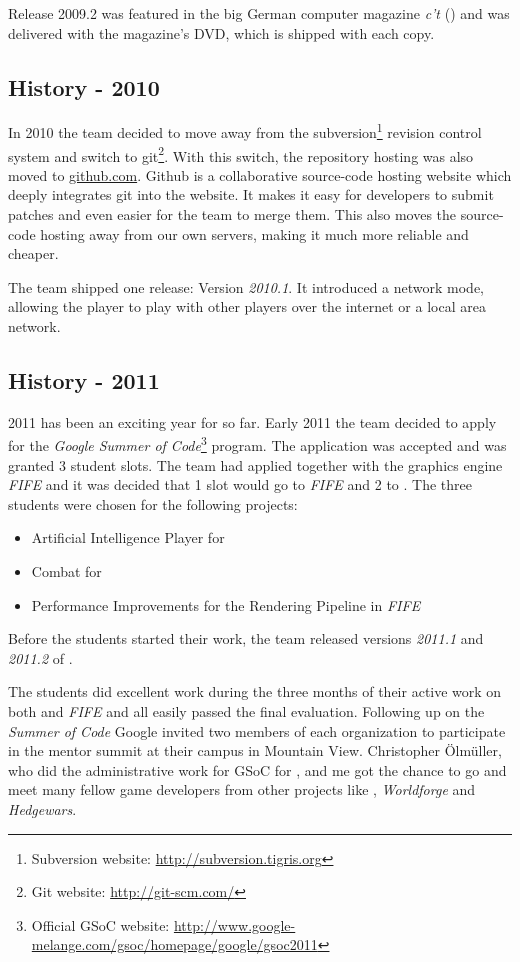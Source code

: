 Release 2009.2 was featured in the big German computer magazine \textit{c't} (\cite{ct}) and was delivered with the magazine's
DVD, which is shipped with each copy.

\pagebreak

\subsection{History - 2010}
In 2010 the team decided to move away from the subversion\footnote{Subversion website: \url{http://subversion.tigris.org}} revision control
system and switch to git\footnote{Git website: \url{http://git-scm.com/}}. With this switch, the repository hosting was also moved to
\href{http://www.github.com}{github.com}. Github is a collaborative source-code hosting website which deeply integrates
git into the website. It makes it easy for developers to submit patches and even easier for the team to merge them. This
also moves the source-code hosting away from our own servers, making it much more reliable and cheaper.

The team shipped one release: Version \textit{2010.1}. It introduced a network mode, allowing the player
to play with other players over the internet or a local area network.

\subsection{History - 2011}
2011 has been an exciting year for \UH{} so far. Early 2011 the team decided to apply for the \textit{Google Summer of
Code}\footnote{Official GSoC website: \url{http://www.google-melange.com/gsoc/homepage/google/gsoc2011}} program. The
application was accepted and \UH{} was granted 3 student slots. The team had applied together with the graphics engine
\textit{FIFE} and it was decided that 1 slot would go to \textit{FIFE} and 2 to \UH{}. The three students were chosen
for the following projects:
\begin{itemize}
    \item Artificial Intelligence Player for \UH{}
    \item Combat for \UH{}
    \item Performance Improvements for the Rendering Pipeline in \textit{FIFE}
\end{itemize}
Before the students started their work, the team released versions \textit{2011.1} and \textit{2011.2} of \UH{}.

The students did excellent work during the three months of their active work on both \UH{} and \textit{FIFE} and all
easily passed the final evaluation. Following up on the \textit{Summer of Code} Google invited two members of each
organization to participate in the mentor summit at their campus in Mountain View. Christopher Ölmüller, who did the
administrative work for GSoC for \UH{}, and me got the chance to go and meet many fellow \OS{} game developers
from other projects like \BOW{}, \textit{Worldforge} and \textit{Hedgewars}.

